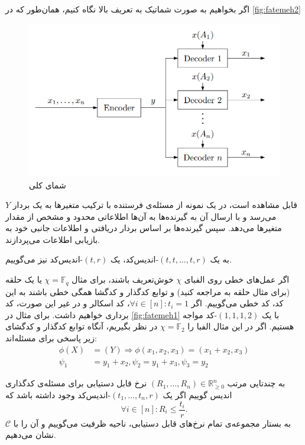 اگر بخواهیم به صورت شماتیک به تعریف بالا نگاه کنیم، همان‌طور که در
\autoref{fig:fatemeh2}
\begin{figure}[b!]
	\centering
	\includegraphics[width=0.7\linewidth]{figs/chapter1/fatemeh2}
	\caption[
		شمای کلی 
	\icod
	]{
		شمای کلی 
		\icod
	\cite{fatemehbook}
	}
	\label{fig:fatemeh2}
\end{figure}
قابل مشاهده است، در یک نمونه از مسئله‌ی
\icod
فرستنده با ترکیب متغیرها به یک بردار
$Y$
می‌رسد و با ارسال آن به گیرنده‌ها به آن‌ها اطلاعاتی محدود و مشخص از مقدار متغیرها می‌دهد. سپس گیرنده‌ها بر اساس بردار دریافتی و اطلاعات جانبی خود به بازیابی اطلاعات می‌پردازند.

	به یک
	$(t, t, \ldots, t, r)$-اندیس‌کد،
	یک
	$(t, r)$-اندیس‌کد
	نیز می‌گوییم.
	
	اگر عمل‌های خطی روی الفبای
	$\chi$
	خوش‌تعریف باشند، برای مثال
	$\chi = \mathbb{F}_q$
	یا یک حلقه (برای مثال حلقه به 
	\cite{Connelly2018}
	مراجعه کنید) و توابع کدگذار و کدگشا همگی خطی باشند به این کد، کد خطی می‌گوییم. اگر 
	$\forall i \in [n]: t_i = 1$،
	کد اسکالر و در غیر این‌ صورت، کد برداری خواهیم داشت. برای مثال در 
	\autoref{fig:fatemeh1}
	با یک 
	$(1, 1, 1, 2)$-کد
	مواجه هستیم. اگر در این مثال الفبا را
	$\chi = \mathbb{F}_2$
	در نظر بگیریم، آنگاه توابع کدگذار و کدگشای زیر پاسخی برای مسئله‌اند:
	\begin{align*}
	\phi(X) &= (Y) \Rightarrow \phi(x_1, x_2, x_3) = (x_1 + x_2, x_3) \\
	\psi_1 &= y_1 + x_2, \psi_2 = y_1 + x_3, \psi_3 = y_2
	\end{align*}
	\begin{definition}
		به چندتایی مرتب
		$(R_1, \ldots, R_n) \in \mathbb{R}_{\geqslant 0}^n$
		نرخ قابل دستیابی برای مسئله‌ی کدگذاری اندیس گوییم اگر یک 
		$(t_1, \ldots, t_n, r)$-اندیس‌کد
		 وجود داشته باشد که
		$$\forall i \in [n]: R_i \leq \frac{t_i}{r}.$$
		به بستار مجموعه‌ی تمام نرخ‌های قابل دستیابی، ناحیه ظرفیت می‌گوییم و آن را با
		$\mathscr{C}$
		نشان می‌دهیم.
	\end{definition}
	
